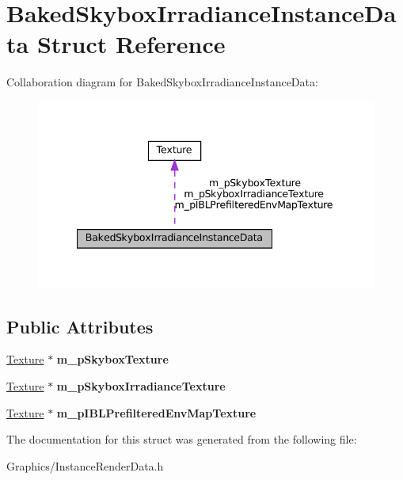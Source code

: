 \hypertarget{structBakedSkyboxIrradianceInstanceData}{}\section{Baked\+Skybox\+Irradiance\+Instance\+Data Struct Reference}
\label{structBakedSkyboxIrradianceInstanceData}


Collaboration diagram for Baked\+Skybox\+Irradiance\+Instance\+Data\+:\nopagebreak
\begin{figure}[H]
\begin{center}
\leavevmode
\includegraphics[width=340pt]{structBakedSkyboxIrradianceInstanceData__coll__graph}
\end{center}
\end{figure}
\subsection*{Public Attributes}
\begin{DoxyCompactItemize}
\item 
\mbox{\label{structBakedSkyboxIrradianceInstanceData_a10ffb1ec82b0032da7b632e87725117a}} 
\hyperlink{classTexture}{Texture} $\ast$ {\bfseries m\+\_\+p\+Skybox\+Texture}
\item 
\mbox{\label{structBakedSkyboxIrradianceInstanceData_abff80b70eb17d661cf39c5260eb21711}} 
\hyperlink{classTexture}{Texture} $\ast$ {\bfseries m\+\_\+p\+Skybox\+Irradiance\+Texture}
\item 
\mbox{\label{structBakedSkyboxIrradianceInstanceData_ad5a3b447d6cf3e8fb7363216b5c19043}} 
\hyperlink{classTexture}{Texture} $\ast$ {\bfseries m\+\_\+p\+I\+B\+L\+Prefiltered\+Env\+Map\+Texture}
\end{DoxyCompactItemize}


The documentation for this struct was generated from the following file\+:\begin{DoxyCompactItemize}
\item 
Graphics/Instance\+Render\+Data.\+h\end{DoxyCompactItemize}
